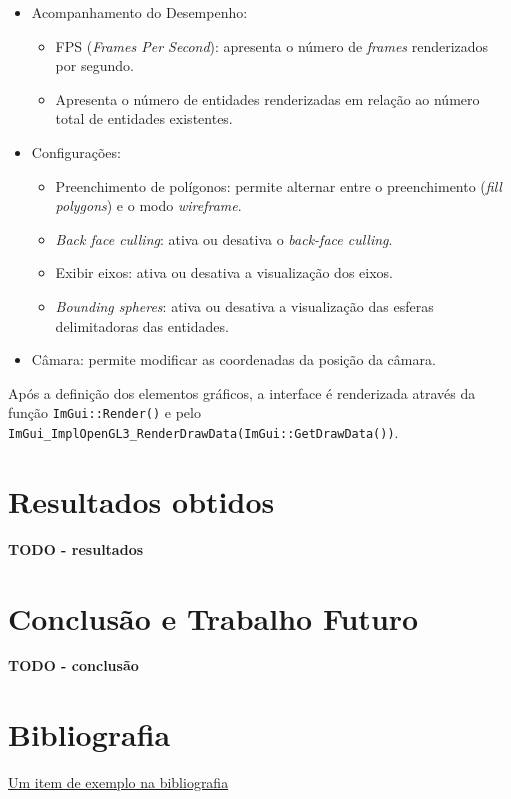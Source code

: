\documentclass[12pt, a4paper]{article}
\begin{document}
\begin{itemize}
    \item Acompanhamento do Desempenho:
    \begin{itemize}
        \item FPS (\textit{Frames Per Second}): apresenta o número de \textit{frames}
        renderizados por segundo.
        \item Apresenta o número de entidades renderizadas em relação ao número total de entidades
        existentes.
    \end{itemize}
    \item Configurações:
    \begin{itemize}
        \item Preenchimento de polígonos: permite alternar entre o preenchimento
        (\textit{fill polygons}) e o modo \textit{wireframe}.
        \item \textit{Back face culling}: ativa ou desativa o \textit{back-face culling}.
        \item Exibir eixos: ativa ou desativa a visualização dos eixos.
        \item \textit{Bounding spheres}: ativa ou desativa a visualização das esferas delimitadoras
        das entidades.
    \end{itemize}
    \item Câmara: permite modificar as coordenadas da posição da câmara.
\end{itemize}

Após a definição dos elementos gráficos, a interface é renderizada através da função
\texttt{ImGui::Render()} e pelo \texttt{ImGui\_ImplOpenGL3\_RenderDrawData(ImGui::GetDrawData())}.

\section{Resultados obtidos}

\textbf{\color{red} TODO - resultados}

\section{Conclusão e Trabalho Futuro}

\textbf{\color{red} TODO - conclusão}

\begingroup
\section{Bibliografia}
\renewcommand{\section}[2]{}

\begin{thebibliography}{9}
        \href{https://youtu.be/dQw4w9WgXcQ}{Um item de exemplo na bibliografia}
\end{thebibliography}
\endgroup
\end{document}
